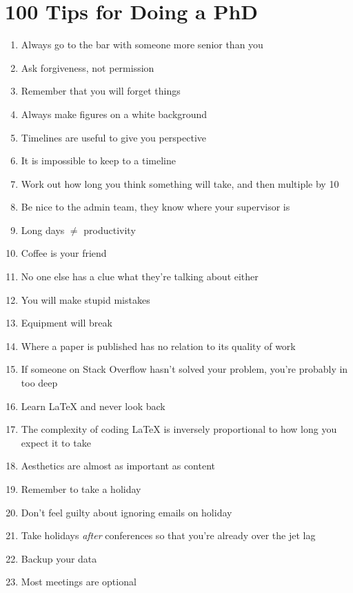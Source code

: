 %
%

\chapter{100 Tips for Doing a PhD}
\label{app:app01}

\begin{enumerate}
	\item Always go to the bar with someone more senior than you
	\item Ask forgiveness, not permission
	\item Remember that you will forget things
	\item Always make figures on a white background
	\item Timelines are useful to give you perspective
	\item It is impossible to keep to a timeline
	\item Work out how long you think something will take, and then multiple by 10 \cite{Hofstadter}
	\item Be nice to the admin team, they know where your supervisor is
	\item Long days $\ne$ productivity
	\item Coffee is your friend
	\item No one else has a clue what they're talking about either
	\item You will make stupid mistakes
	\item Equipment will break
	\item Where a paper is published has no relation to its quality of work 
	\item If someone on Stack Overflow hasn't solved your problem, you're probably in too deep
	\item Learn \LaTeX{} and never look back
	\item The complexity of coding \LaTeX{} is inversely proportional to how long you expect it to take
	\item Aesthetics are almost as important as content
	\item Remember to take a holiday
	\item Don't feel guilty about ignoring emails on holiday
	\item Take holidays \textit{after} conferences so that you're already over the jet lag
	\item Backup your data
	\item Most meetings are optional

\end{enumerate}
